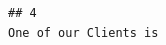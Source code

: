 \documentclass[11pt,a4paper,]{article}
\begin{document}
\begin{verbatim}
## 4                                                                                                                                                                                                                                                                                                                                                                                                                                                                                                                                                                                                                                                                                                                                                                                                                                                                                                                                                                                                                                                                                                                                                                                                                                                                                                                                                                                                                                                                                                                                                                                                                                                                                                                                                                                                                                                                                                                                                                                                                                                                                                                                                                                                                                                                                                                                                                                                                                                                                                                                                                                                                                                                                                                                                                                                                                                                                                                                                                                                                                                                                                                                                                                                                                                                                                                                                                                                                      One of our Clients is 
\end{verbatim}
\end{document}

